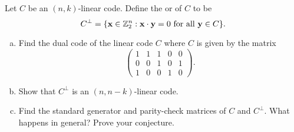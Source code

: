  
\begin{exercise}{}
Let $C$ be an $(n,k)$-linear code. Define the  or  of $C$  to be 
\[
C^\perp = \{ {\bold x} \in {\Bbb Z}_2^n :  {\bold x} \cdot {\bold y} =
0 \mbox{ for all } {\bold y} \in C \}. 
\]

\begin{enumerate}[(a)]
\item
Find the dual code of the linear code $C$ where $C$ is given by the
matrix 
\[
\left(
\begin{array}{ccccc}
1 & 1 & 1 & 0 & 0 \\
0 & 0 & 1 & 0 & 1 \\
1 & 0 & 0 & 1 & 0
\end{array}
\right).
\]
 
\item
Show that $C^\perp$ is an $(n, n-k)$-linear code.
 
\item
Find the standard generator and parity-check matrices of $C$ and
$C^\perp$. What happens in general? Prove your conjecture. 
\end{enumerate}

 \end{exercise}
 

